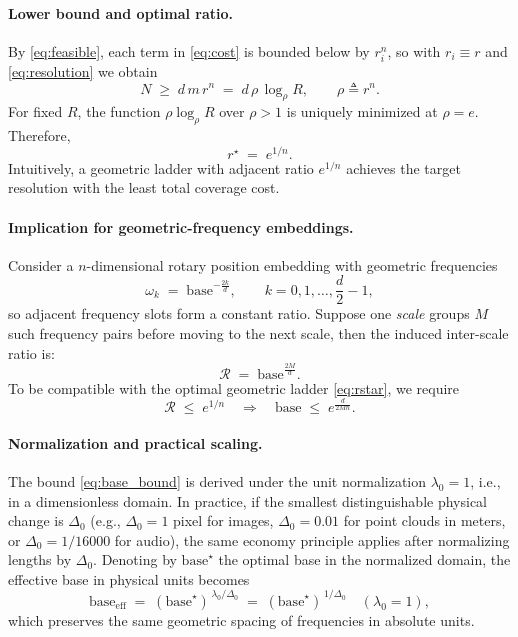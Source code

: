 \documentclass{article}
\theoremstyle{plain}
\theoremstyle{definition}
\theoremstyle{remark}
\begin{document}
\paragraph{Lower bound and optimal ratio.}
By \eqref{eq:feasible}, each term in \eqref{eq:cost} is bounded below by $r_i^n$, so with $r_i\equiv r$ and \eqref{eq:resolution} we obtain
\begin{equation}
N \;\ge\; d\,m\,r^n
\;=\; d\,\rho\,\log_{\rho}R,
\qquad \rho \triangleq r^n .
\label{eq:Nbound}
\end{equation}
For fixed $R$, the function $\rho\log_{\rho}R$ over $\rho>1$ is uniquely minimized at $\rho=e$. Therefore,
\begin{equation}
r^\star \;=\; e^{1/n}.
\label{eq:rstar}
\end{equation}
Intuitively, a geometric ladder with adjacent ratio $e^{1/n}$ achieves the target resolution with the least total coverage cost.

\paragraph{Implication for geometric-frequency embeddings.}
Consider a $n$-dimensional rotary position embedding with geometric frequencies
\begin{equation}
\omega_k \;=\; \text{base}^{-\frac{2k}{d}},
\qquad
k=0,1,\dots,\frac{d}{2}-1,
\label{eq:ropefreq}
\end{equation}
so adjacent frequency slots form a constant ratio. Suppose one \emph{scale} groups $M$ such frequency pairs before moving to the next scale, then the induced inter-scale ratio is:
\begin{equation}
\mathcal{R}
\;=\;
\text{base}^{\frac{2M}{d}} .
\label{eq:scale_ratio_from_base}
\end{equation}
To be compatible with the optimal geometric ladder \eqref{eq:rstar}, we require
\begin{equation}
\mathcal{R} \;\le\; e^{1/n}
\quad\Longrightarrow\quad
\text{base} \;\le\; e^{\frac{d}{2Mn}} .
\label{eq:base_bound}
\end{equation}

\paragraph{Normalization and practical scaling.}
The bound \eqref{eq:base_bound} is derived under the unit normalization $\lambda_0=1$, i.e., in a dimensionless domain. In practice, if the smallest distinguishable physical change is $\Delta_0$ (e.g., $\Delta_0=1$ pixel for images, $\Delta_0=0.01$ for point clouds in meters, or $\Delta_0=1/16000$ for audio), the same economy principle applies after normalizing lengths by $\Delta_0$. Denoting by $\text{base}^\star$ the optimal base in the normalized domain, the effective base in physical units becomes
\begin{equation}
\text{base}_{\mathrm{eff}}
\;=\;
(\text{base}^\star)^{\,\lambda_0/\Delta_0}
\;=\;
(\text{base}^\star)^{\,1/\Delta_0}
\quad(\lambda_0=1),
\label{eq:base_scaling}
\end{equation}
which preserves the same geometric spacing of frequencies in absolute units.
\end{document}
